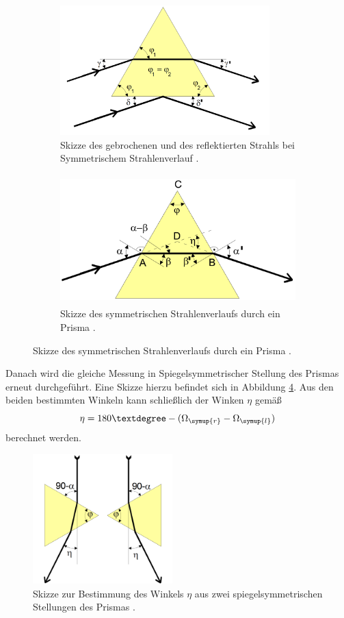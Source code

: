 \begin{figure}[H]
  \centering
  \begin{subfigure}{0.48\textwidth}
    \includegraphics[height=5cm]{data/eta1.png}
    \caption{Skizze des gebrochenen und des reflektierten Strahls bei Symmetrischem
    Strahlenverlauf \cite{Versuchsanleitung}.}
    \label{fig:eta1}
  \end{subfigure}
  \begin{subfigure}{0.48\textwidth}
    \includegraphics[height=5cm]{data/symmetrisch.png}
    \caption{Skizze des symmetrischen Strahlenverlaufs durch ein Prisma \cite{Versuchsanleitung}.}
    \label{fig:symmetrisch}
  \end{subfigure}
\end{figure}

Danach wird die gleiche Messung in Spiegelsymmetrischer Stellung des Prismas erneut
durchgeführt. Eine Skizze hierzu befindet sich in Abbildung \ref{fig:eta2}.
Aus den beiden bestimmten Winkeln kann schließlich der Winken $\eta$ gemäß
\begin{equation}
  \eta=180°-(\Omega_{\symup{r}}-\Omega_{\symup{l}})
  \label{eqn:eta}
\end{equation}
berechnet werden.

\begin{figure}[H]
  \centering
  \includegraphics[height=5cm]{data/eta2.png}
  \caption{Skizze zur Bestimmung des Winkels $\eta$ aus zwei spiegelsymmetrischen Stellungen
  des Prismas \cite{Versuchsanleitung}.}
  \label{fig:eta2}
\end{figure}

